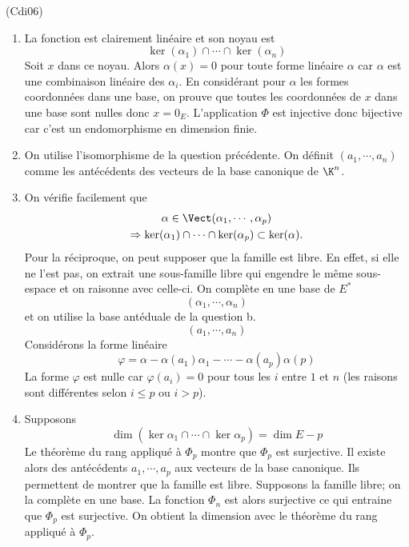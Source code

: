 \begin{tiny}(Cdi06)\end{tiny} \label{exo: di06}
\begin{enumerate}
  \item La fonction est clairement linéaire et son noyau est
\begin{displaymath}
  \ker(\alpha_1) \cap \cdots \cap \ker(\alpha_n)
\end{displaymath}
Soit $x$ dans ce noyau. Alors $\alpha(x)=0$ pour toute forme linéaire $\alpha$ car $\alpha$ est une combinaison linéaire des $\alpha_i$. En considérant pour $\alpha$ les formes coordonnées dans une base, on prouve que toutes les coordonnées de $x$ dans une base sont nulles donc $x=0_E$. L'application $\Phi$ est injective donc bijective car c'est un endomorphisme en dimension finie.

  \item On utilise l'isomorphisme de la question précédente. On définit $(a_1,\cdots,a_n)$ comme les antécédents des vecteurs de la base canonique de $\K^n$. 
  
  \item On vérifie facilement que
\begin{multline*}
  \alpha \in \Vect(\alpha_1,\cdots, \alpha_p) \\
  \Rightarrow \ker(\alpha_1) \cap \cdots \cap \ker(\alpha_p) \subset \ker(\alpha).
\end{multline*}
Pour la réciproque, on peut supposer que la famille est libre. En effet, si elle ne l'est pas, on extrait une sous-famille libre qui engendre le même sous-espace et on raisonne avec celle-ci.\newline
On complète en une base de $E^*$
\begin{displaymath}
  (\alpha_1,\cdots, \alpha_n)
\end{displaymath}
et on utilise la base antéduale de la question b.
\begin{displaymath}
  (a_1,\cdots, a_n)
\end{displaymath}
Considérons la forme linéaire
\begin{displaymath}
  \varphi = \alpha - \alpha(a_1)\alpha_1 - \cdots - \alpha(a_p)\alpha(p)
\end{displaymath}
La forme $\varphi$ est nulle car $\varphi(a_i)=0$ pour tous les $i$ entre $1$ et $n$ (les raisons sont différentes selon $i\leq p$ ou $i>p$). 

  \item Supposons
\begin{displaymath}
  \dim(\ker \alpha_1\cap\cdots\cap\ker\alpha_p) = \dim E -p
\end{displaymath}
Le théorème du rang appliqué à $\Phi_p$ montre que $\Phi_p$ est surjective. Il existe alors des antécédents $a_1,\cdots,a_p$ aux vecteurs de la base canonique. Ils permettent de montrer que la famille est libre.\newline
Supposons la famille libre; on la complète en une base. La fonction $\Phi_n$ est alors surjective ce qui entraine que $\Phi_p$ est surjective. On obtient la dimension avec le théorème du rang appliqué à $\Phi_p$.
\end{enumerate}
